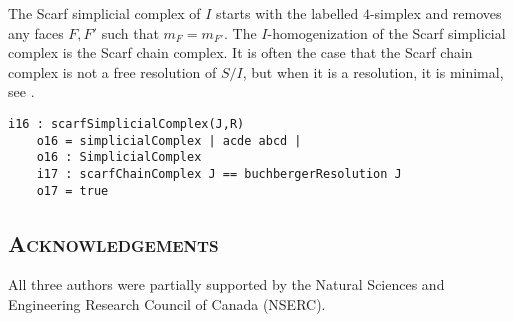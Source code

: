\documentclass[12pt,leqno]{amsart}
\theoremstyle{definition}
\begin{document}
The Scarf simplicial complex of $I$ starts with the labelled $4$-simplex and removes any faces $F,F'$ such that $m_F = m_{F'}$. The $I$-homogenization of the Scarf simplicial complex is the Scarf chain complex. It is often the case that the Scarf chain complex is not a free resolution of $S/I$, but when it is a resolution, it is minimal, see \cite[Lemma 3.1]{BPS}.
\begin{lstlisting}[basicstyle={\ttfamily \scriptsize}, xleftmargin=-23pt]
    i16 : scarfSimplicialComplex(J,R)
    o16 = simplicialComplex | acde abcd |
    o16 : SimplicialComplex
    i17 : scarfChainComplex J == buchbergerResolution J
    o17 = true
\end{lstlisting}



\subsection*{\scshape\mdseries Acknowledgements}
All three authors were partially supported by the Natural Sciences and
Engineering Research Council of Canada (NSERC).


\end{document}
